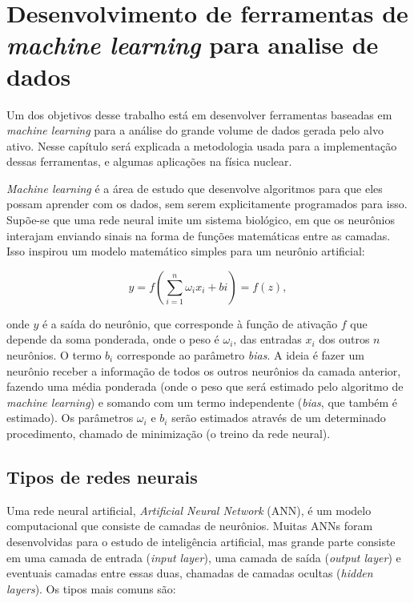 \documentclass[a4paper,12pt,oneside]{book}
\begin{document}
\chapter{Desenvolvimento de ferramentas de \textit{machine learning} para analise de dados}\label{sec:ml}

\par Um dos objetivos desse trabalho está em desenvolver ferramentas baseadas em \textit{machine learning} para a análise do grande volume de dados gerada pelo alvo ativo. Nesse capítulo será explicada a metodologia usada para a implementação dessas ferramentas, e algumas aplicações na física nuclear.

\par \textit{Machine learning} é a área de estudo que desenvolve algoritmos para que eles possam aprender com os dados, sem serem explicitamente programados para isso\cite{mlbook}. Supõe-se que uma rede neural imite um sistema biológico, em que os neurônios interajam enviando sinais na forma de funções matemáticas entre as camadas. Isso inspirou um modelo matemático simples para um neurônio artificial:

\begin{equation}\label{eq:model_n}
    y = f\left(\sum^{n}_{i = 1}\omega_i x_i + bi\right) = f(z),
\end{equation}

\par onde $y$ é a saída do neurônio, que corresponde à função de ativação $f$ que depende da soma ponderada, onde o peso é $\omega_i$, das entradas $x_i$ dos outros $n$ neurônios. O termo $b_i$ corresponde ao parâmetro \textit{bias}. A ideia é fazer um neurônio receber a informação de todos os outros neurônios da camada anterior, fazendo uma média ponderada (onde o peso que será estimado pelo algoritmo de \textit{machine learning}) e somando com um termo independente (\textit{bias}, que também é estimado). Os parâmetros $\omega_i$ e $b_i$ serão estimados através de um determinado procedimento, chamado de minimização (o treino da rede neural).

\section{Tipos de redes neurais}

\par Uma rede neural artificial, \textit{Artificial Neural Network} (ANN), é um modelo computacional que consiste de camadas de neurônios. Muitas ANNs foram desenvolvidas para o estudo de inteligência artificial\cite{mlbook, mldiverso}, mas grande parte consiste em uma camada de entrada (\textit{input layer}), uma camada de saída (\textit{output layer}) e eventuais camadas entre essas duas, chamadas de camadas ocultas (\textit{hidden layers}). Os tipos mais comuns são:
\end{document}
